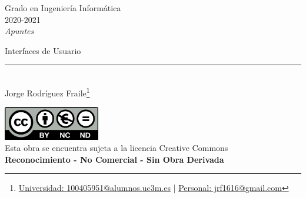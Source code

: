 \documentclass[12pt, twoside, openright]{report} %
\begin{document}

\begin{titlepage}
	\begin{sffamily}
		\color{azulUC3M}
		\begin{center}
			\begin{figure}[H] %
			\end{figure}
			\vspace{2.5cm}
			\begin{Large}
				Grado en Ingeniería Informática\\
				2020-2021\\
				\vspace{2cm}
				\textsl{Apuntes}\\
				\bigskip
			\end{Large}
			{\Huge Interfaces de Usuario}\\
			\vspace*{0.5cm}
			\rule{10.5cm}{0.1mm}\\
			\vspace*{0.9cm}
			{\LARGE Jorge Rodríguez Fraile\footnote{\href{mailto:100405951@alumnos.uc3m.es}{Universidad: 100405951@alumnos.uc3m.es}  |  \href{mailto:jrf1616@gmail.com}{Personal: jrf1616@gmail.com}}}\\
			\vspace*{1cm}
		\end{center}
		\vfill
		\color{black}
		\includegraphics[width=4.2cm]{img/creativecommons.png}\\
		Esta obra se encuentra sujeta a la licencia Creative Commons\\ \textbf{Reconocimiento - No Comercial - Sin Obra Derivada}
	\end{sffamily}
\end{titlepage}


\tableofcontents
\thispagestyle{fancy}
\end{document}
